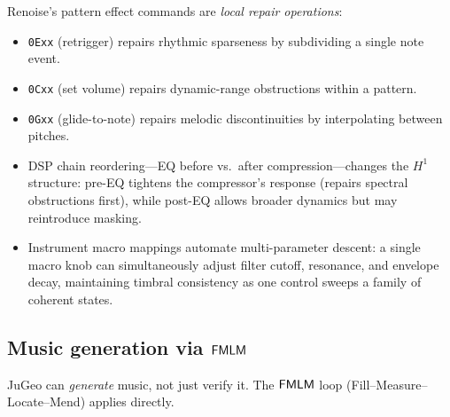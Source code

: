 \begin{remark}
Renoise's pattern effect commands are \emph{local repair
operations}:
\begin{itemize}
  \item \texttt{0Exx} (retrigger) repairs rhythmic sparseness by
        subdividing a single note event.
  \item \texttt{0Cxx} (set volume) repairs dynamic-range
        obstructions within a pattern.
  \item \texttt{0Gxx} (glide-to-note) repairs melodic
        discontinuities by interpolating between pitches.
  \item DSP chain reordering---EQ before vs.\ after
        compression---changes the $H^1$ structure: pre-EQ
        tightens the compressor's response (repairs spectral
        obstructions first), while post-EQ allows broader
        dynamics but may reintroduce masking.
  \item Instrument macro mappings automate multi-parameter descent:
        a single macro knob can simultaneously adjust filter
        cutoff, resonance, and envelope decay, maintaining
        timbral consistency as one control sweeps a family of
        coherent states.
\end{itemize}
\end{remark}

\subsection{Music generation via \texorpdfstring{$\mathsf{FMLM}$}{FMLM}}
\label{ssec:musical-fmlm}

JuGeo can \emph{generate} music, not just verify it.  The
$\mathsf{FMLM}$ loop (Fill--Measure--Locate--Mend) applies directly.

